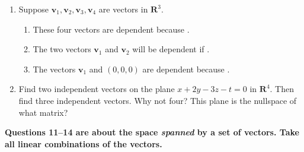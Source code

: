 \documentclass[14pt, a4paper]{article}
\begin{document}
\begin{enumerate}
    \item Suppose $\boldsymbol{v}_1, \boldsymbol{v}_2, \boldsymbol{v}_3, \boldsymbol{v}_4$ are vectors in $\mathbf{R}^3$.
          \begin{enumerate}
              \item These four vectors are dependent because \underline{\hspace{2cm}}.
              \item The two vectors $\boldsymbol{v}_1$ and $\boldsymbol{v}_2$ will be dependent if \underline{\hspace{2cm}}.
              \item The vectors $\boldsymbol{v}_1$ and $(0,0,0)$ are dependent because \underline{\hspace{2cm}}.
          \end{enumerate}

    \item Find two independent vectors on the plane $x + 2y - 3z - t = 0$ in $\mathbf{R}^4$. Then find three independent vectors. Why not four? This plane is the nullspace of what matrix?
\end{enumerate}

\noindent \textbf{Questions 11--14 are about the space \emph{spanned} by a set of vectors. Take all linear combinations of the vectors.}
\end{document}
